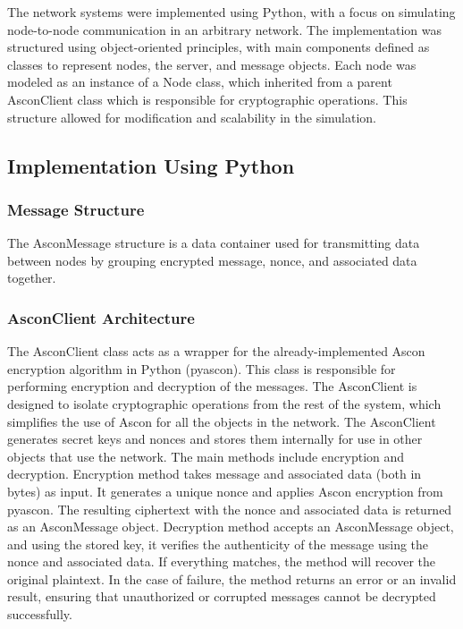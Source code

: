 \documentclass[journal]{IEEEtran}
\begin{document}
The network systems were implemented using Python, with a focus on simulating node-to-node communication in an arbitrary network. The implementation was structured using object-oriented principles, with main components defined as classes to represent nodes, the server, and message objects. Each node was modeled as an instance of a Node class, which inherited from a parent AsconClient class which is responsible for cryptographic operations. This structure allowed for modification and scalability in the simulation.

\subsection{Implementation Using Python}

\subsubsection{Message Structure}
The AsconMessage structure is a data container used for transmitting data between nodes by grouping encrypted message, nonce, and associated data together. 

\subsubsection{AsconClient Architecture}

The AsconClient class acts as a wrapper for the already-implemented Ascon encryption algorithm in Python (pyascon). This class is responsible for performing encryption and decryption of the messages. The AsconClient is designed to isolate cryptographic operations from the rest of the system, which simplifies the use of Ascon for all the objects in the network. The AsconClient generates secret keys and nonces and stores them internally for use in other objects that use the network. The main methods include encryption and decryption. Encryption method takes message and associated data (both in bytes) as input. It generates a unique nonce and applies Ascon encryption from pyascon. The resulting ciphertext with the nonce and associated data is returned as an AsconMessage object. Decryption method accepts an AsconMessage object, and using the stored key, it verifies the authenticity of the message using the nonce and associated data. If everything matches, the method will recover the original plaintext. In the case of failure, the method returns an error or an invalid result, ensuring that unauthorized or corrupted messages cannot be decrypted successfully.
\end{document}
